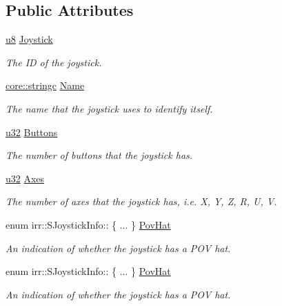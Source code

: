 \subsection*{Public Attributes}
\begin{DoxyCompactItemize}
\item 
\hyperlink{namespaceirr_a646874f69af8ff87fc10201b0254a761}{u8} \hyperlink{structirr_1_1SJoystickInfo_a691ed1bcdbf4ab3b30a4e9ed648c6d9d}{Joystick}
\begin{DoxyCompactList}\small\item\em The ID of the joystick. \end{DoxyCompactList}\item 
\mbox{\label{structirr_1_1SJoystickInfo_a56d229ae1e1d9f18b252c2f6bf886815}} 
\hyperlink{namespaceirr_1_1core_ab26a0e0359206b5a694f35c37c829d7f}{core\+::stringc} \hyperlink{structirr_1_1SJoystickInfo_a56d229ae1e1d9f18b252c2f6bf886815}{Name}
\begin{DoxyCompactList}\small\item\em The name that the joystick uses to identify itself. \end{DoxyCompactList}\item 
\mbox{\label{structirr_1_1SJoystickInfo_a31422460c315e69bc057367cb66e4d23}} 
\hyperlink{namespaceirr_a0416a53257075833e7002efd0a18e804}{u32} \hyperlink{structirr_1_1SJoystickInfo_a31422460c315e69bc057367cb66e4d23}{Buttons}
\begin{DoxyCompactList}\small\item\em The number of buttons that the joystick has. \end{DoxyCompactList}\item 
\hyperlink{namespaceirr_a0416a53257075833e7002efd0a18e804}{u32} \hyperlink{structirr_1_1SJoystickInfo_a0a09d1c3fc664207abaa610e5896b0c5}{Axes}
\begin{DoxyCompactList}\small\item\em The number of axes that the joystick has, i.\+e. X, Y, Z, R, U, V. \end{DoxyCompactList}\item 
enum irr\+::\+S\+Joystick\+Info\+:: \{ ... \}  \hyperlink{structirr_1_1SJoystickInfo_a2abf9d4741731c29fe4d9d64f7909d1e}{Pov\+Hat}
\begin{DoxyCompactList}\small\item\em An indication of whether the joystick has a P\+OV hat. \end{DoxyCompactList}\item 
enum irr\+::\+S\+Joystick\+Info\+:: \{ ... \}  \hyperlink{structirr_1_1SJoystickInfo_a7ae6fd321ceed7a05aeb07c4e3009238}{Pov\+Hat}
\begin{DoxyCompactList}\small\item\em An indication of whether the joystick has a P\+OV hat. \end{DoxyCompactList}\end{DoxyCompactItemize}



